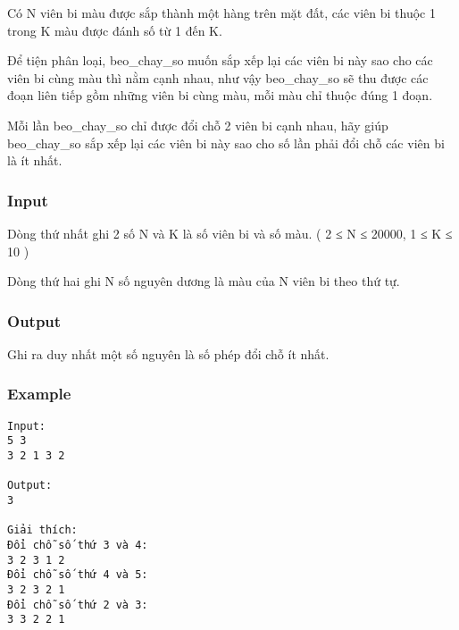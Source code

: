 



   Có N viên bi màu được sắp thành một hàng trên mặt đất, các viên bi thuộc 1 trong K màu được đánh số từ 1 đến K.  

   Để tiện phân loại, beo\_chay\_so muốn sắp xếp lại các viên bi này sao cho các viên bi cùng màu thì nằm cạnh nhau, như vậy beo\_chay\_so sẽ thu được các đoạn liên tiếp gồm những viên bi cùng màu, mỗi màu chỉ thuộc đúng 1 đoạn.  

   Mỗi lần beo\_chay\_so chỉ được đổi chỗ 2 viên bi cạnh nhau, hãy giúp beo\_chay\_so sắp xếp lại các viên bi này sao cho số lần phải đổi chỗ các viên bi là ít nhất.  

\subsubsection{   Input  }

   Dòng thứ nhất ghi 2 số N và K là số viên bi và số màu. ( 2 ≤ N ≤ 20000, 1 ≤ K ≤ 10 )  

   Dòng thứ hai ghi N số nguyên dương là màu của N viên bi theo thứ tự.  

\subsubsection{   Output  }

   Ghi ra duy nhất một số nguyên là số phép đổi chỗ ít nhất.  

\subsubsection{   Example  }
\begin{verbatim}
Input:
5 3
3 2 1 3 2

Output:
3

Giải thích:
Đổi chỗ số thứ 3 và 4:
3 2 3 1 2
Đổi chỗ số thứ 4 và 5:
3 2 3 2 1
Đổi chỗ số thứ 2 và 3:
3 3 2 2 1
\end{verbatim}